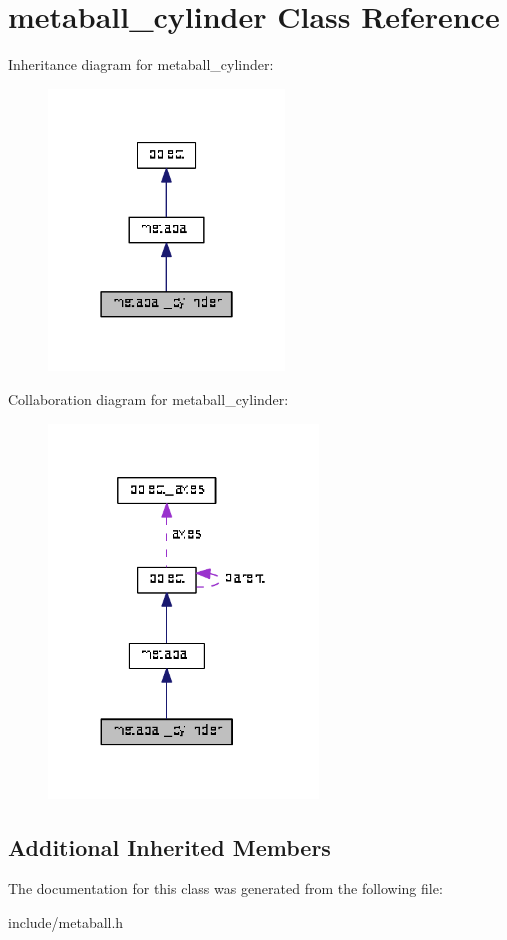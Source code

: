 \hypertarget{classmetaball__cylinder}{}\section{metaball\+\_\+cylinder Class Reference}
\label{classmetaball__cylinder}


Inheritance diagram for metaball\+\_\+cylinder\+:\nopagebreak
\begin{figure}[H]
\begin{center}
\leavevmode
\includegraphics[width=178pt]{classmetaball__cylinder__inherit__graph}
\end{center}
\end{figure}


Collaboration diagram for metaball\+\_\+cylinder\+:\nopagebreak
\begin{figure}[H]
\begin{center}
\leavevmode
\includegraphics[width=203pt]{classmetaball__cylinder__coll__graph}
\end{center}
\end{figure}
\subsection*{Additional Inherited Members}


The documentation for this class was generated from the following file\+:\begin{DoxyCompactItemize}
\item 
include/metaball.\+h\end{DoxyCompactItemize}
